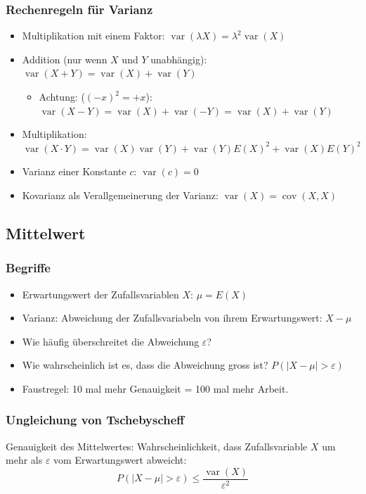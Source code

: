 \subsubsection{Rechenregeln für Varianz}
\begin{itemize}
  \item Multiplikation mit einem Faktor:
    $\operatorname{var}(\lambda X) = \lambda^2 \operatorname{var}(X)$
  \item Addition (nur wenn $X$ und $Y$ unabhängig):
    $\operatorname{var}(X+Y) = \operatorname{var}(X) + \operatorname{var}(Y)$
    \begin{itemize}
      \item Achtung: ($(-x)^2 = +x$): $\operatorname{var}(X-Y) =
      \operatorname{var}(X) + \operatorname{var}(-Y) =
      \operatorname{var}(X) + \operatorname{var}(Y)$
    \end{itemize}
  \item Multiplikation: $\operatorname{var}(X \cdot Y) = \operatorname{var}(X)
    \operatorname{var}(Y) + \operatorname{var}(Y)E(X)^2 + \operatorname{var}(X)E(Y)^2$
  \item Varianz einer Konstante $c$: $\operatorname{var}(c) = 0$
  \item Kovarianz als Verallgemeinerung der Varianz:
    $\operatorname{var}(X) = \operatorname{cov}(X,X)$
\end{itemize}

\subsection{Mittelwert}
\subsubsection{Begriffe}
\begin{itemize}
  \item Erwartungswert der Zufallsvariablen $X$: $\mu = E(X)$
  \item Varianz: Abweichung der Zufallsvariabeln von ihrem
    Erwartungswert: $X -\mu$
  \item Wie häufig überschreitet die Abweichung $\varepsilon$?
  \item Wie wahrscheinlich ist es, dass die Abweichung gross ist?
    $P(|X - \mu| > \varepsilon)$
  \item Faustregel: 10 mal mehr Genauigkeit = 100 mal mehr Arbeit.
\end{itemize}
\subsubsection{Ungleichung von Tschebyscheff}
Genauigkeit des Mittelwertes: Wahrscheinlichkeit, dass Zufallsvariable
$X$ um mehr als $\varepsilon$ vom Erwartungswert abweicht:
\[P(|X-\mu| > \varepsilon) \le \frac{\operatorname{var}(X)}{\varepsilon^2} \]
